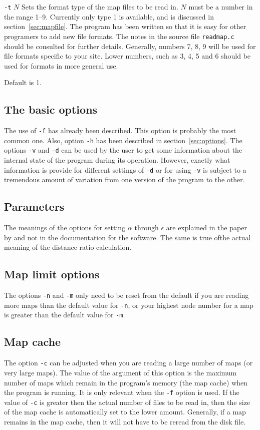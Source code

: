 \documentclass[%
	11pt,
        a4paper,
        twoside]{workrep}
\newcommand*{\file}[1]{\texttt{#1}}		%
\newcommand*{\opt}[1]{\texttt{#1}}		%
\newlength{\lentrylen}
\newcommand{\lentrylabel}[1]{%
   \settowidth{\lentrylen}{#1}%
   \ifthenelse{\lengthtest{\lentrylen > \labelwidth}}%
      {\parbox[b]{\labelwidth}{\makebox[0pt][l]{#1}\\}}%
      {#1}%
   \hfil\relax}
\newenvironment{optlist}[1][35pt]
    {\renewcommand{\entrylabel}{\lentrylabel}\begin{entry}[#1]}
    {\end{entry}}
\newenvironment{entry}[1][35pt]
  {\begin{list}{}%
    {\renewcommand{\makelabel}{\entrylabel}%
      \setlength{\labelwidth}{#1}%
      \setlength{\leftmargin}{\labelwidth}%
      \addtolength{\leftmargin}{\labelsep}}}
  {\end{list}}
\newcommand{\entrylabel}[1]{\mbox{\textsf{#1:}}\hfil}
\begin{document}
\begin{optlist}
\item[\texttt{-t} $N$]
	Sets the format type of the map files to be read in.
	$N$ must be a number in the range 1--9.  Currently
	only type 1 is available, and is discussed in 
	section~\ref{sec:mapfile}.  The program
	has been written so that it is easy for other programers
	to add new file formats.  The notes in the source
	file \file{readmap.c} should be consulted for further details.
	Generally, numbers 7, 8, 9 will be used for file
	formats specific to your site.  Lower numbers, such as
	3, 4, 5 and 6 should be used for formats in more
	general use.

	Default is 1.
\end{optlist}

\subsection{The basic options}

The use of \opt{-f} has already been described.  This option is
probably the most common one.  Also, option \opt{-h} has been described
in section~\ref{sec:options}.  The options \opt{-v} and \opt{-d} can
be used by the user to get some information about the internal state
of the program during its operation.  However, exactly what information
is provide for different settings of \opt{-d} or for using \opt{-v}
is subject to a tremendous amount of variation from one version of
the program to the other.

\subsection{Parameters}

The meanings of the options for setting $\alpha$ through $\epsilon$ are
explained in the paper by  and not
in the documentation for the software.  The same is true ofthe
actual meaning of the distance ratio calculation.

\subsection{Map limit options}
The options \opt{-n} and \opt{-m} only need to be reset from the default
if you are reading more maps than the default value for \opt{-n},
or your highest node number for a map is greater than the default
value for \opt{-m}.

\subsection{Map cache}
The option \opt{-c} can be adjusted when you are reading a large
number of maps (or very large maps).  The value of the argument of
this option is the maximum number of maps which remain in the program's
memory (the map cache) when the program is running.  It is only relevant
when the \opt{-f} option is used.  If the value of \opt{-c} is
greater then the actual number of files to be read in, then the
size of the map cache is automatically set to the lower amount.
Generally, if a map remains in the map cache, then it will not
have to be reread from the disk file.
\end{document}
